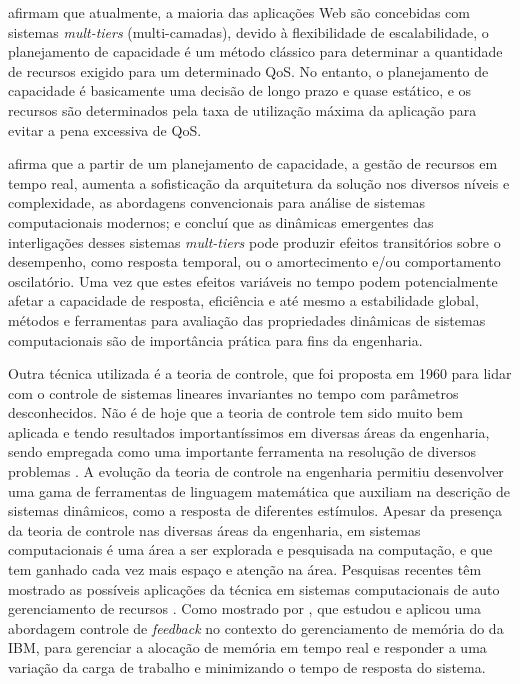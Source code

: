  afirmam que atualmente, a maioria das aplicações Web são concebidas com sistemas \textit{mult-tiers} (multi-camadas), devido à flexibilidade de escalabilidade, o planejamento de capacidade é um método clássico para determinar a quantidade de recursos exigido para um determinado QoS. No entanto, o planejamento de capacidade é basicamente uma decisão de longo prazo e quase estático, e os recursos são determinados pela taxa de utilização máxima da aplicação para evitar a pena excessiva de QoS.

 afirma que a partir de um planejamento de capacidade, a gestão de recursos em tempo real, aumenta a sofisticação da arquitetura da solução nos diversos níveis e complexidade, as abordagens convencionais para análise de sistemas computacionais modernos; e concluí que as dinâmicas emergentes das interligações desses sistemas \textit{mult-tiers} pode produzir efeitos transitórios sobre o desempenho, como resposta temporal, ou o amortecimento e/ou comportamento oscilatório. Uma vez que estes efeitos variáveis no tempo podem potencialmente afetar a capacidade de resposta, eficiência e até mesmo a estabilidade global, métodos e ferramentas para avaliação das propriedades dinâmicas de sistemas computacionais são de importância prática para fins da engenharia.

Outra técnica utilizada é a teoria de controle, que foi proposta em 1960 para lidar com o controle de sistemas lineares invariantes no tempo com parâmetros desconhecidos. Não é de hoje que a teoria de controle tem sido muito bem aplicada e tendo resultados importantíssimos em diversas áreas da engenharia, sendo empregada como uma importante ferramenta na resolução de diversos problemas \cite{Ogata2001}. A evolução da teoria de controle na engenharia permitiu desenvolver uma gama de ferramentas de linguagem matemática que auxiliam na descrição de sistemas dinâmicos, como a resposta de diferentes estímulos. Apesar da presença da teoria de controle nas diversas áreas da engenharia, em sistemas computacionais é uma área a ser explorada e pesquisada na computação, e que tem ganhado cada vez mais espaço e atenção na área. Pesquisas recentes têm mostrado as possíveis aplicações da técnica em sistemas computacionais de auto gerenciamento de recursos \cite{Nobile2013}. Como mostrado por , que estudou e aplicou uma abordagem controle de \textit{feedback} no contexto do gerenciamento de memória do  da IBM,  para gerenciar a alocação de memória em tempo real e responder a uma variação da carga de trabalho e minimizando o tempo de resposta do sistema.

